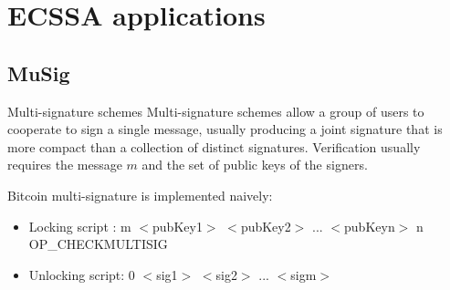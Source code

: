 \documentclass[slidescentered]{beamer}
\begin{document}
	
	\section{ECSSA applications}
	
	\subsection{MuSig}
	\begin{frame}{Multi-signature schemes}
		Multi-signature schemes allow a group of users to cooperate to sign a single message, usually producing a joint signature that is more compact than a collection of distinct signatures. Verification usually requires the message $m$ and the set of public keys of the signers.
		
		\bigskip
		\noindent
		Bitcoin multi-signature is implemented naively:
		\pause
		\begin{itemize}
			\item<2 -> Locking script : m $<$pubKey1$>$ $<$pubKey2$>$ ... $<$pubKeyn$>$ \hphantom{em} \hphantom{em} \hphantom{em} \hphantom{ipsem}n
OP\_CHECKMULTISIG
			\item<3 -> Unlocking script: 0 $<$sig1$>$ $<$sig2$>$ ... $<$sigm$>$
		\end{itemize}
	\end{frame}
\end{document}
